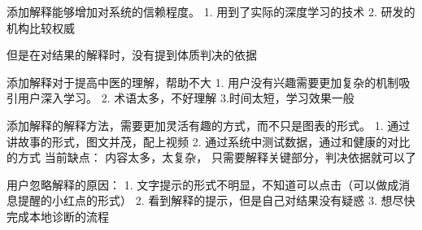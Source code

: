 添加解释能够增加对系统的信赖程度。
1. 用到了实际的深度学习的技术
2. 研发的机构比较权威

但是在对结果的解释时，没有提到体质判决的依据

添加解释对于提高中医的理解，帮助不大
1. 用户没有兴趣需要更加复杂的机制吸引用户深入学习。
2. 术语太多，不好理解
3.时间太短，学习效果一般

添加解释的解释方法，需要更加灵活有趣的方式，而不只是图表的形式。
1. 通过讲故事的形式，图文并茂，配上视频
2. 通过系统中测试数据，通过和健康的对比的方式
当前缺点： 内容太多，太复杂， 只需要解释关键部分，判决依据就可以了

用户忽略解释的原因：
1. 文字提示的形式不明显，不知道可以点击（可以做成消息提醒的小红点的形式）
2. 看到解释的提示，但是自己对结果没有疑惑
3. 想尽快完成本地诊断的流程



